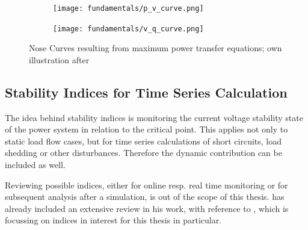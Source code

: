 \begin{figure}[htbp!]
    \centering
    \begin{subfigure}[b]{.49\linewidth}
        \texttt{[image: fundamentals/p\_v\_curve.png]}
    \end{subfigure}
    \begin{subfigure}[b]{.49\linewidth}
        \texttt{[image: fundamentals/v\_q\_curve.png]}
    \end{subfigure}
    \caption[Nose Curves resulting from maximum power transfer equations]{Nose Curves resulting from maximum power transfer equations; own illustration after \autocite{machowski_2020,kundur_2022,cutsem_1998}}
    \label{fig:v-stability-system}
\end{figure}




\subsection{Stability Indices for Time Series Calculation}
\label{sec:stability-indices}

The idea behind stability indices is monitoring the current voltage stability state of the power system in relation to the critical point.
This applies not only to static load flow cases, but for time series calculations of short circuits, load shedding or other disturbances.
Therefore the dynamic contribution can be included as well. \quelle

Reviewing possible indices, either for online resp. real time monitoring or for subsequent analysis after a simulation, is out of the scope of this thesis.
\textcite{danish_2015} has already included an extensive review in his work, with reference to \textcite{doigcardet_2010}, which is focussing on indices in interest for this thesis in particular. 


